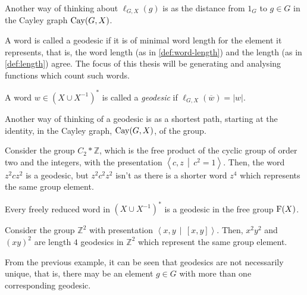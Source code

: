\begin{remark}
	Another way of thinking about $\ell_{G,X}(g)$ is as the distance from  $1_G$ to $g \in G$ in the Cayley graph $\operatorname{Cay}(G,X)$.
	\thmendmark
\end{remark}

A word is called a geodesic if it is of minimal word length for the element it represents, that is, the word length (as in \cref{def:word-length}) and the length (as in \cref{def:length}) agree.
The focus of this thesis will be generating and analysing functions which count such words.

\begin{definition}
	\label{def:geodesic}
	A word $w\in \left(X \cup X^{-1}\right)^\ast$ is called a \emph{geodesic} if $\ell_{G,X}(\overline{w}) = \left\vert w \right\vert$.
\end{definition}

\begin{remark}
	Another way of thinking of a geodesic is as a shortest path, starting at the identity, in the Cayley graph, $\operatorname{Cay}(G,X)$, of the group.
\end{remark}

\begin{example}
	Consider the group $C_2 \ast \mathbb{Z}$, which is the free product of the cyclic group of order two and the integers, with the presentation $\left\langle c,z \, \middle\vert \, c^2 = 1 \right\rangle$.
	Then, the word $z^2 c z^2$ is a geodesic, but $z^2 c^2 z^2$ isn't as there is a shorter word $z^4$ which represents the same group element.
\end{example}

\begin{example}
	Every freely reduced word in $\left( X \cup X^{-1} \right)^\ast$ is a geodesic in the free group $\operatorname{F}(X)$.
\end{example}

\begin{example}
	Consider the group $\mathbb{Z}^2$ with presentation $\left\langle x,y \, \middle\vert \, [x,y] \right\rangle$.
	Then, $x^2 y^2$ and $(xy)^2$ are length $4$ geodesics in $\mathbb{Z}^2$ which represent the same group element.
\end{example}

\begin{remark}
	From the previous example, it can be seen that geodesics are not necessarily unique, that is, there may be an element $g \in G$ with more than one corresponding geodesic.
\end{remark}

